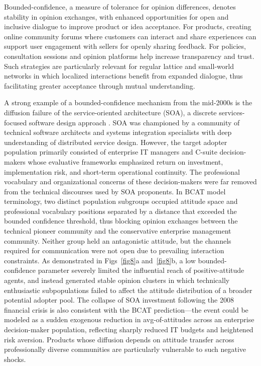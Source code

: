 \documentclass[10pt,letterpaper]{article}
\begin{document}
Bounded-confidence, a measure of tolerance for opinion differences, denotes stability in opinion exchanges, with enhanced opportunities for open and inclusive dialogue to improve product or idea acceptance. For products, creating online community forums where customers can interact and share experiences can support user engagement with sellers for openly sharing feedback. For policies, consultation sessions and opinion platforms help increase transparency and trust. Such strategies are particularly relevant for regular lattice and small-world networks in which localized interactions benefit from expanded dialogue, thus facilitating greater acceptance through mutual understanding.

A strong example of a bounded-confidence mechanism from the mid-2000s is the diffusion failure of the service-oriented architecture (SOA), a discrete services-focused software design approach \cite{Erl2005}. SOA was championed by a community of technical software architects and systems integration specialists with deep understanding of distributed service design. However, the target adopter population primarily consisted of enterprise IT managers and C-suite decision-makers whose evaluative frameworks emphasized return on investment, implementation risk, and short-term operational continuity. The professional vocabulary and organizational concerns of these decision-makers were far removed from the technical discourses used by SOA proponents. In BCAT model terminology, two distinct population subgroups occupied attitude space and professional vocabulary positions separated by a distance that exceeded the bounded confidence threshold, thus blocking opinion exchanges between the technical pioneer community and the conservative enterprise management community. Neither group held an antagonistic attitude, but the channels required for communication were not open due to prevailing interaction constraints. As demonstrated in Figs~\ref{fig8}a and~\ref{fig8}b, a low bounded-confidence parameter severely limited the influential reach of positive-attitude agents, and instead generated stable opinion clusters in which technically enthusiastic subpopulations failed to affect the attitude distribution of a broader potential adopter pool. The collapse of SOA investment following the 2008 financial crisis is also consistent with the BCAT prediction---the event could be modeled as a sudden exogenous reduction in avg-of-attitudes across an enterprise decision-maker population, reflecting sharply reduced IT budgets and heightened risk aversion. Products whose diffusion depends on attitude transfer across professionally diverse communities are particularly vulnerable to such negative shocks.
\end{document}
